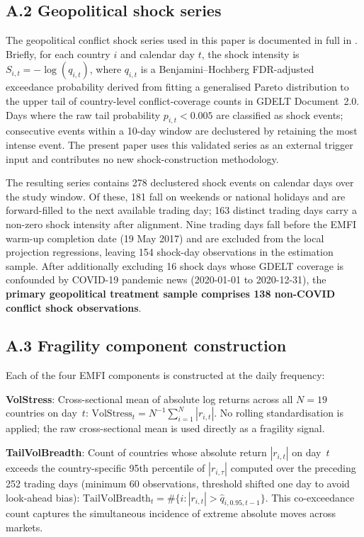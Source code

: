 \documentclass[11pt]{article}
\begin{document}
\subsection*{A.2 Geopolitical shock series}

The geopolitical conflict shock series used in this paper is documented in full in \citet{lupu2026bir}. Briefly, for each country $i$ and calendar day $t$, the shock intensity is $S_{i,t} = -\log(q_{i,t})$, where $q_{i,t}$ is a Benjamini--Hochberg FDR-adjusted exceedance probability derived from fitting a generalised Pareto distribution to the upper tail of country-level conflict-coverage counts in GDELT Document~2.0. Days where the raw tail probability $p_{i,t} < 0.005$ are classified as shock events; consecutive events within a 10-day window are declustered by retaining the most intense event. The present paper uses this validated series as an external trigger input and contributes no new shock-construction methodology.

The resulting series contains 278 declustered shock events on calendar days over the study window. Of these, 181 fall on weekends or national holidays and are forward-filled to the next available trading day; 163 distinct trading days carry a non-zero shock intensity after alignment. Nine trading days fall before the EMFI warm-up completion date (19 May 2017) and are excluded from the local projection regressions, leaving 154 shock-day observations in the estimation sample. After additionally excluding 16 shock days whose GDELT coverage is confounded by COVID-19 pandemic news (2020-01-01 to 2020-12-31), the \textbf{primary geopolitical treatment sample comprises 138 non-COVID conflict shock observations}.

\subsection*{A.3 Fragility component construction}

Each of the four EMFI components is constructed at the daily frequency:

\textbf{VolStress}: Cross-sectional mean of absolute log returns across all $N=19$ countries on day~$t$: $\text{VolStress}_t = N^{-1}\sum_{i=1}^{N}|r_{i,t}|$. No rolling standardisation is applied; the raw cross-sectional mean is used directly as a fragility signal.

\textbf{TailVolBreadth}: Count of countries whose absolute return $|r_{i,t}|$ on day~$t$ exceeds the country-specific 95th percentile of $|r_{i,\tau}|$ computed over the preceding 252 trading days (minimum 60 observations, threshold shifted one day to avoid look-ahead bias): $\text{TailVolBreadth}_t = \#\{i : |r_{i,t}| > \hat{q}_{i,0.95,t-1}\}$. This co-exceedance count captures the simultaneous incidence of extreme absolute moves across markets.
\end{document}
